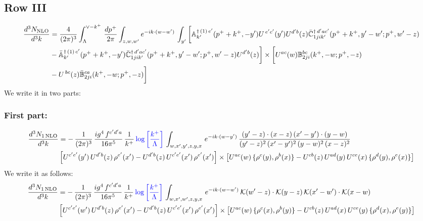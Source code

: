 \documentclass[9pt]{article}
\def\mf#1{\mathbb{#1}}
\numberwithin{equation}{section}
\begin{document}
 \subsection{Row III}
 \begin{align}
    \frac{d^{3}N_{\rm NLO}}{d^{3}k} & =   \frac{4}{(2\pi)^{3}} \int_{\Lambda}^{\vee -k^{+}}\, \frac{dp^{+}}{2\pi}\int_{z,w,w^{\prime}} e^{-ik\cdot (w-w')}\,\int_{y^{\prime}}\bigg[\mf{A}^{\dagger\, (1)\,e^{\prime}}_{k^{\prime}}(p^{+}+k^{+},-y^{\prime})U^{\, e^{\prime}c^{\prime}}(y^{\prime})U^{d^{\prime}b}(z) \Bar{\mf{C}}^{\dagger\, d^{\prime}ac^{\prime}}_{1jik^{\prime}}(p^{+}+k^{+},y^{\prime}-w^{\prime}; p^{+},w^{\prime}-z)\notag \\ &  -\Bar{\mf{A}}^{\dagger\, (1)\,c^{\prime}}_{k^{\prime}}(p^{+}+k^{+},-y^{\prime}) \Bar{\mf{C}}^{\dagger\, d^{\prime}ac^{\prime}}_{1jik^{\prime}}(p^{+}+k^{+},y^{\prime}-w^{\prime}; p^{+},w^{\prime}-z)U^{d^{\prime}b}(z)\bigg] \times \bigg[U^{ac}(w) \mf{B}^{bc}_{2ji}(k^{+},-w;p^{+},-z)\notag \\ &  -U^{\, bc}(z)\Bar{\mf{B}}^{ca}_{2ji}(k^{+},-w; p^{+},-z)\bigg]\nonumber
\end{align}
We write it in two parts:
\subsubsection{First part:}
\begin{align}
     \frac{d^{3}N_{1\,\rm NLO}}{d^{3}k} & = -\,\frac{1}{(2\pi)^{3}}\, \frac{ig^{4}\,f^{c'd'a}}{16\pi^{5}}\, \frac{1}{k^{+}}\,{\color{blue}\log{\left[\frac{k^{+}}{\Lambda}\right]}}\, \int_{w,x',y',z,y,x}\, e^{-ik\cdot (w-y')}\,\frac{(y'-z)\cdot (x-z)\,(x'-y')\cdot (y-w)}{(y'-z)^{2}\,(x'-y')^{2}\,(y-w)^{2}\,(x-z)^{2}}\notag \\ &  \left[U^{c'e'}(y')\,U^{d'b}(z)\,\rho^{e'}(x')-U^{d'b}(z)\,U^{c'e'}(x')\,\rho^{e'}(x')\right]\times  \left[U^{ac}(w)\, \{\rho^{c}(y),\rho^{b}(x)\}-U^{cb}(z)\,U^{ad}(y)\,U^{ce}(x)\,\{\rho^{d}(y),\rho^{e}(x)\}\right]
\end{align} 
We write it as follows:
\begin{align}
     \frac{d^{3}N_{1\,\rm NLO}}{d^{3}k} & = -\,\frac{1}{(2\pi)^{3}}\, \frac{ig^{4}\,f^{c'd'a}}{16\pi^{5}}\, \frac{1}{k^{+}}\,{\color{blue}\log{\left[\frac{k^{+}}{\Lambda}\right]}}\, \int_{w,x',w',z,y,x}\, e^{-ik\cdot (w-w')}\,\mathcal{K}(w'-z)\cdot \mathcal{K}(y-z)\,\mathcal{K}(x'-w')\cdot \mathcal{K}(x-w)\notag \\ &  \left[U^{c'e'}(w')\,U^{d'b}(z)\,\rho^{e'}(x')-U^{d'b}(z)\,U^{c'e'}(x')\,\rho^{e'}(x')\right]\times  \left[U^{ac}(w)\, \{\rho^{c}(x),\rho^{b}(y)\}-U^{cb}(z)\,U^{ad}(x)\,U^{ce}(y)\,\{\rho^{d}(x),\rho^{e}(y)\}\right]
\end{align}
\end{document}
